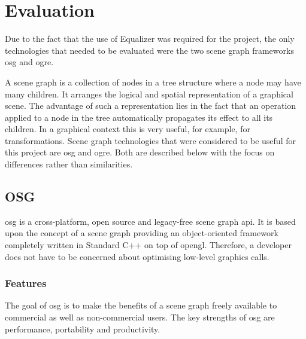 \chapter{Evaluation}
\label{sec:evaluation}
Due to the fact that the use of Equalizer was required for the project, the only technologies that needed to be evaluated were the two scene graph frameworks \gls{osg} and \gls{ogre}. 

A scene graph is a collection of nodes in a tree structure where a node may have many children. It arranges the logical and spatial representation of a graphical scene. The advantage of such a representation lies in the fact that an operation applied to a node in the tree automatically propagates its effect to all its children. In a graphical context this is very useful, for example, for transformations.
Scene graph technologies that were considered to be useful for this project are \gls{osg} and \gls{ogre}. Both are described below with the focus on differences rather than similarities.

\section{OSG}
\gls{osg} \cite{website:osgWeb} is a cross-platform, open source and legacy-free scene graph \gls{api}. It is based upon the concept of a scene graph providing an object-oriented framework completely written in Standard C++ on top of \gls{opengl}. Therefore, a developer does not have to be concerned about optimising low-level graphics calls.

\subsection{Features}
The goal of \gls{osg} is to make the benefits of a scene graph freely available to commercial as well as non-commercial users. The key strengths of \gls{osg} are performance, portability and productivity.

